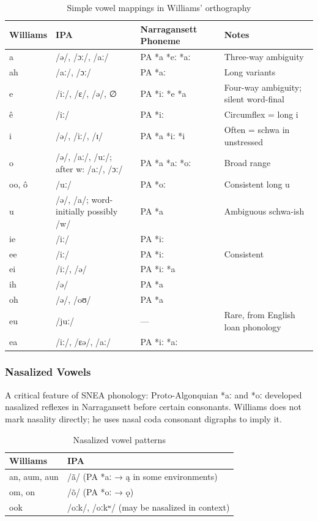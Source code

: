 \begin{table}[h]
\centering
\begin{tabular}{llll}
\toprule
Williams & IPA & Narragansett Phoneme & Notes \\
\midrule
a & /ə/, /ɔː/, /aː/ & PA *a *eː *aː & Three-way ambiguity \\
ah & /aː/, /ɔː/ & PA *aː & Long variants \\
e & /iː/, /ɛ/, /ə/, ∅ & PA *iː *e *a & Four-way ambiguity; silent word-final \\
ê & /iː/ & PA *iː & Circumflex = long i \\
i & /ə/, /iː/, /ɪ/ & PA *a *iː *i & Often = schwa in unstressed \\
o & /ə/, /aː/, /uː/; after w: /aː/, /ɔː/ & PA *a *aː *oː & Broad range \\
oo, ô & /uː/ & PA *oː & Consistent long u \\
u & /ə/, /a/; word-initially possibly /w/ & PA *a & Ambiguous schwa-ish \\
ie & /iː/ & PA *iː & \\
ee & /iː/ & PA *iː & Consistent \\
ei & /iː/, /ə/ & PA *iː *a & \\
ih & /ə/ & PA *a & \\
oh & /ə/, /oʊ/ & PA *a & \\
eu & /juː/ & --- & Rare, from English loan phonology \\
ea & /iː/, /ɛə/, /aː/ & PA *iː *aː & \\
\bottomrule
\end{tabular}
\caption{Simple vowel mappings in Williams' orthography}
\label{tab:1362-vowels}
\end{table}

\subsubsection{Nasalized Vowels}

A critical feature of SNEA phonology: Proto-Algonquian *aː and *oː developed
nasalized reflexes in Narragansett before certain consonants. Williams does
not mark nasality directly; he uses nasal coda consonant digraphs to imply it.

\begin{table}[h]
\centering
\begin{tabular}{ll}
\toprule
Williams & IPA \\
\midrule
an, aum, aun & /ã/ (PA *aː → ą in some environments) \\
om, on & /õ/ (PA *oː → ǫ) \\
ook & /oːk/, /oːkʷ/ (may be nasalized in context) \\
\bottomrule
\end{tabular}
\caption{Nasalized vowel patterns}
\label{tab:1362-nasal}
\end{table}

